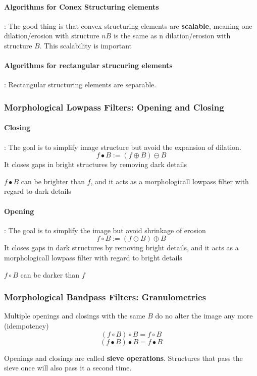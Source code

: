 \documentclass{article}
\begin{document}
\paragraph{Algorithms for Conex Structuring elements}: The good thing is that convex structuring elements are \textbf{scalable}, meaning one dilation/erosion with structure $nB$ is the same as n dilation/erosion with structure $B$. This scalability is important

\paragraph{Algorithms for rectangular strucuring elements}: Rectangular structuring elements are separable.

\subsubsection{Morphological Lowpass Filters: Opening and Closing}
\paragraph{Closing}: The goal is to simplify image structure but avoid the expansion of dilation.
\[f \bullet B := (f \oplus B) \ominus B\]
It closes gaps in bright structures by removing dark details

$f \bullet B$ can be brighter than $f$, and it acts as a morphologicall lowpass filter with regard to dark details

\paragraph{Opening}: The goal is to simplify the image but avoid shrinkage of erosion
\[f \circ B := (f \ominus B) \oplus B\]
It closes gaps in dark structures by removing bright details, and it acts as a morphologicall lowpass filter with regard to bright details

$f \circ B$ can be darker than $f$

\subsubsection{Morphological Bandpass Filters: Granulometries}
Multiple openings and closings with the same $B$ do no alter the image any more (idempotency)
\[(f \circ B) \circ B = f \circ B\]
\[(f \bullet B) \bullet B = f \bullet B\]

Openings and closings are called \textbf{sieve operations}. Structures that pass the sieve once will also pass it a second time.
\end{document}
